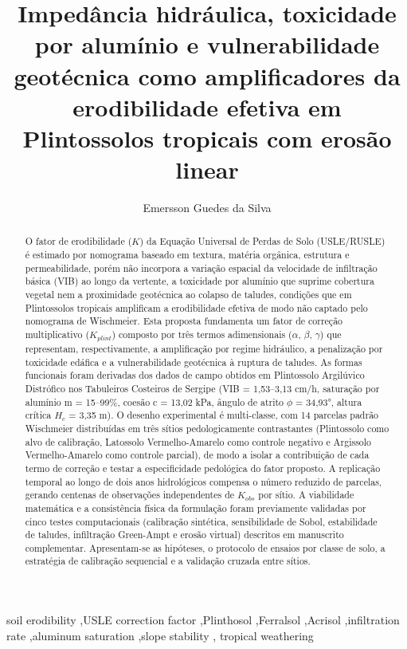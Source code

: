 \documentclass[
  brazilian,
  authoryear,
  preprint]{elsarticle}
\begin{document}
\begin{frontmatter}
\title{Impedância hidráulica, toxicidade por alumínio e vulnerabilidade
geotécnica como amplificadores da erodibilidade efetiva em Plintossolos
tropicais com erosão linear}
\author[1]{Emersson Guedes da Silva%
%
}



        
\begin{abstract}
O fator de erodibilidade (\(K\)) da Equação Universal de Perdas de Solo
(USLE/RUSLE) é estimado por nomograma baseado em textura, matéria
orgânica, estrutura e permeabilidade, porém não incorpora a variação
espacial da velocidade de infiltração básica (VIB) ao longo da vertente,
a toxicidade por alumínio que suprime cobertura vegetal nem a
proximidade geotécnica ao colapso de taludes, condições que em
Plintossolos tropicais amplificam a erodibilidade efetiva de modo não
captado pelo nomograma de Wischmeier. Esta proposta fundamenta um fator
de correção multiplicativo (\(K_{plint}\)) composto por três termos
adimensionais (\(\alpha\), \(\beta\), \(\gamma\)) que representam,
respectivamente, a amplificação por regime hidráulico, a penalização por
toxicidade edáfica e a vulnerabilidade geotécnica à ruptura de taludes.
As formas funcionais foram derivadas dos dados de campo obtidos em
Plintossolo Argilúvico Distrófico nos Tabuleiros Costeiros de Sergipe
(VIB = 1,53--3,13 cm/h, saturação por alumínio m = 15--99\%, coesão c =
13,02 kPa, ângulo de atrito \(\phi\) = 34,93°, altura crítica \(H_c\) =
3,35 m). O desenho experimental é multi-classe, com 14 parcelas padrão
Wischmeier distribuídas em três sítios pedologicamente contrastantes
(Plintossolo como alvo de calibração, Latossolo Vermelho-Amarelo como
controle negativo e Argissolo Vermelho-Amarelo como controle parcial),
de modo a isolar a contribuição de cada termo de correção e testar a
especificidade pedológica do fator proposto. A replicação temporal ao
longo de dois anos hidrológicos compensa o número reduzido de parcelas,
gerando centenas de observações independentes de \(K_{obs}\) por sítio.
A viabilidade matemática e a consistência física da formulação foram
previamente validadas por cinco testes computacionais (calibração
sintética, sensibilidade de Sobol, estabilidade de taludes, infiltração
Green-Ampt e erosão virtual) descritos em manuscrito complementar.
Apresentam-se as hipóteses, o protocolo de ensaios por classe de solo, a
estratégia de calibração sequencial e a validação cruzada entre sítios.
\end{abstract}





\begin{keyword}
    soil erodibility \sep USLE correction
factor \sep Plinthosol \sep Ferralsol \sep Acrisol \sep infiltration
rate \sep aluminum saturation \sep slope stability \sep 
    tropical weathering
\end{keyword}
\end{frontmatter}
    
\end{document}
